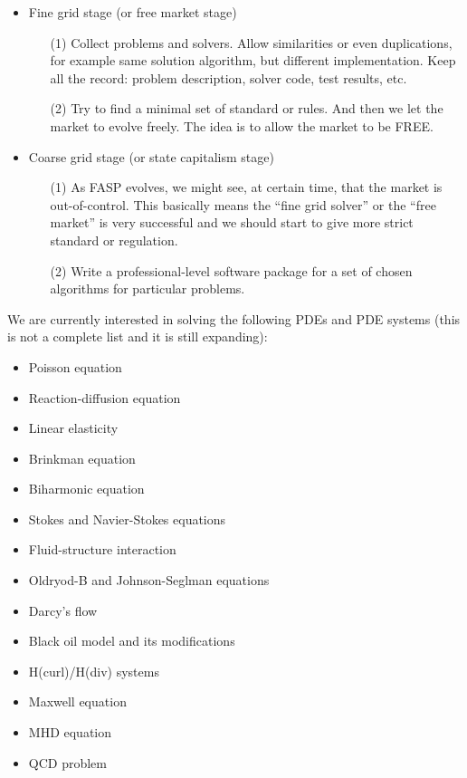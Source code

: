 \documentclass[11pt]{memoir}
\begin{document}
\begin{itemize}

\item Fine grid stage (or free market stage)

\begin{enumerate}
\item[(1)] Collect problems and solvers. Allow similarities or even duplications, for example same solution algorithm, but different implementation. Keep all the record: problem description, solver code, test results, etc. 
%
\item[(2)] Try to find a minimal set of standard or rules. And then we let the market to evolve freely. The idea is to allow the market to be FREE. 
\end{enumerate}

\item Coarse grid stage (or state capitalism stage)

\begin{enumerate}
\item[(1)] As FASP evolves, we might see, at certain time, that the market is out-of-control. This basically means the ``fine grid solver'' or the ``free market'' is very successful and we should start to give more strict standard or regulation.
%
\item[(2)] Write a professional-level software package for a set of chosen algorithms for particular problems.
\end{enumerate}
\end{itemize}
%
We are currently interested in solving the following PDEs and PDE systems (this is not a complete list and it is still expanding):
\begin{itemize}
\item Poisson equation
\item Reaction-diffusion equation
\item Linear elasticity
\item Brinkman equation
\item Biharmonic equation
\item Stokes and Navier-Stokes equations
\item Fluid-structure interaction
\item Oldryod-B and Johnson-Seglman equations
\item Darcy's flow
\item Black oil model and its modifications
\item H(curl)/H(div) systems
\item Maxwell equation
\item MHD equation
\item QCD problem
\end{itemize}
%
\end{document}

